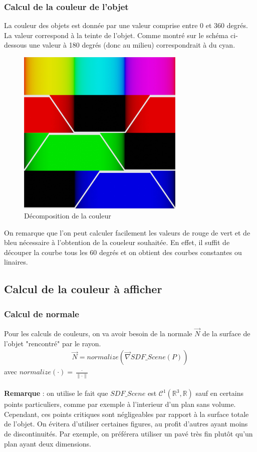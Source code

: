 \newpage
\subsubsection{Calcul de la couleur de l'objet}

La couleur des objets est donnée par une valeur comprise entre 0 et 360 degrés. La valeur correspond à la teinte de l'objet. Comme montré sur le schéma ci-dessous une valeur à 180 degrés (donc au milieu) correspondrait à du cyan.

\begin{figure}[h]
    \centering
    \includegraphics[width=8cm]{images/huetorgb.jpg}
    \caption{Décomposition de la couleur }
    \label{fig:huetorb}
\end{figure}

On remarque que l'on peut calculer facilement les valeurs de rouge de vert et de bleu nécessaire à l'obtention de la coueleur souhaitée.
En effet, il suffit de découper la courbe tous les 60 degrés et on obtient des courbes constantes ou linaires.

\subsection{Calcul de la couleur à afficher}
\subsubsection{Calcul de normale}
Pour les calculs de couleurs, on va avoir besoin de la normale $\Vec{N}$ de la surface de l'objet "rencontré" par le rayon.
\begin{align*}
    \Vec{N}=normalize(\Vec{\nabla}SDF\_Scene(P))
\end{align*}
avec $normalize(\cdot )=\frac{\cdot }{\|\cdot \|}$\\
\\
\textbf{Remarque} : on utilise le fait que $SDF\_Scene$ est $\mathcal{C}^1(\mathbb{R}^3,\mathbb{R})$ sauf en certains points particuliers, comme par exemple à l'interieur d'un plan sans volume. Cependant, ces points critiques sont négligeables par rapport à la surface totale de l'objet. On évitera d'utiliser certaines figures, au profit d'autres ayant moins de discontinuités. Par exemple, on préférera utiliser un pavé très fin plutôt qu'un plan ayant deux dimensions.
